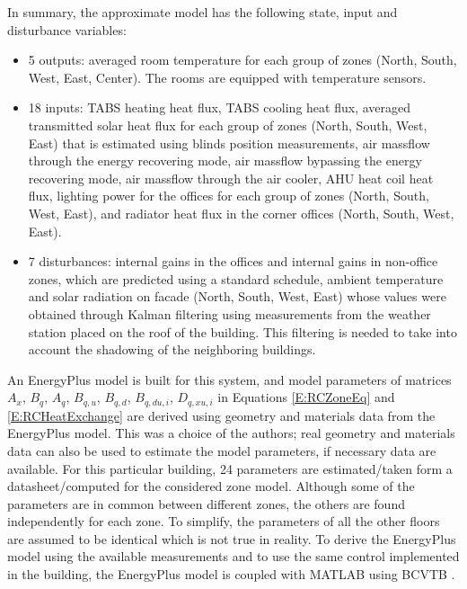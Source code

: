 \textcolor[rgb]{0,0,1}{In summary, the approximate model has the following state, input and disturbance variables:
	\begin{itemize}
		\item 5 outputs: averaged room temperature for each group of zones (North, South, West, East, Center). The rooms are equipped with temperature sensors.
		\item 18 inputs: TABS heating heat flux, TABS cooling heat flux, averaged transmitted solar heat flux for each group of zones (North, South, West, East) that is estimated using blinds position measurements, air massflow through the energy recovering mode, air massflow bypassing the energy recovering mode, air massflow through the air cooler, AHU heat coil heat flux, lighting power for the offices for each group of zones (North, South, West, East), and radiator heat flux in the corner offices (North, South, West, East).
		\item 7 disturbances: internal gains in the offices and internal gains in non-office zones, which are predicted using a standard schedule, ambient temperature and solar radiation on facade (North, South, West, East) whose values were obtained through Kalman filtering using measurements from the weather station placed on the roof of the building. This filtering is needed to take into account the shadowing of the neighboring buildings.
	\end{itemize}
An EnergyPlus model is built for this system, and model parameters of matrices $A_x$, $B_q$, $A_q$, $B_{q,u}$, $B_{q,d}$, $B_{q,du,i}$, $D_{q,xu,i}$ in Equations \eqref{E:RCZoneEq} and \eqref{E:RCHeatExchange} are derived using geometry and materials data from the EnergyPlus model.
This was a choice of the authors; real geometry and materials data can also be used to estimate the model parameters, if necessary data are available. 
For this particular building, 24 parameters are estimated/taken form a datasheet/computed for the considered zone model.
Although some of the parameters are in common between different zones, the others are found independently for each zone.
To simplify, the parameters of all the other floors are assumed to be identical which is not true in reality.
To derive the EnergyPlus model using the available measurements and to use the same control implemented in the building, the EnergyPlus model is coupled with MATLAB using BCVTB \cite{Wetter2015}.
}

